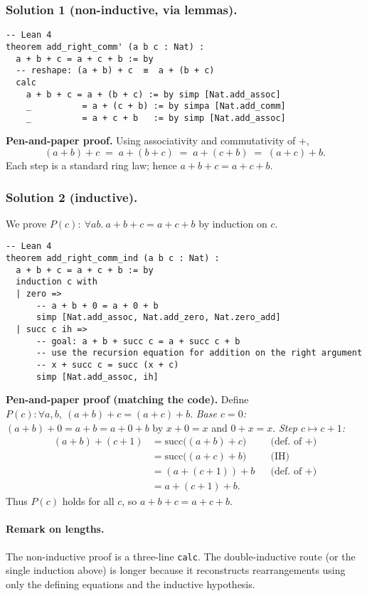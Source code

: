 \documentclass{article}
\theoremstyle{theorem}
\theoremstyle{definition}
\theoremstyle{remark}
\begin{document}
\subsubsection*{Solution 1 (non-inductive, via lemmas).}
\begin{lstlisting}
-- Lean 4
theorem add_right_comm' (a b c : Nat) :
  a + b + c = a + c + b := by
  -- reshape: (a + b) + c  ≡  a + (b + c)
  calc
    a + b + c = a + (b + c) := by simp [Nat.add_assoc]
    _          = a + (c + b) := by simpa [Nat.add_comm]
    _          = a + c + b   := by simp [Nat.add_assoc]
\end{lstlisting}

\noindent\textbf{Pen-and-paper proof.}
Using associativity and commutativity of $+$,
\[
(a+b)+c \;=\; a+(b+c) \;=\; a+(c+b) \;=\; (a+c)+b.
\]
Each step is a standard ring law; hence $a+b+c = a+c+b$.

\subsubsection*{Solution 2 (inductive).}
We prove $P(c):\ \forall a b.\ a+b+c=a+c+b$ by induction on $c$.

\begin{lstlisting}
-- Lean 4
theorem add_right_comm_ind (a b c : Nat) :
  a + b + c = a + c + b := by
  induction c with
  | zero =>
      -- a + b + 0 = a + 0 + b
      simp [Nat.add_assoc, Nat.add_zero, Nat.zero_add]
  | succ c ih =>
      -- goal: a + b + succ c = a + succ c + b
      -- use the recursion equation for addition on the right argument
      -- x + succ c = succ (x + c)
      simp [Nat.add_assoc, ih]
\end{lstlisting}

\noindent\textbf{Pen-and-paper proof (matching the code).}
Define $P(c)\!:\!\forall a,b,\ (a+b)+c=(a+c)+b$.  
\emph{Base $c=0$:} $(a+b)+0=a+b=a+0+b$ by $x+0=x$ and $0+x=x$.  
\emph{Step $c\mapsto c+1$:}
\[
\begin{aligned}
(a+b)+(c+1) &= \mathrm{succ}\big((a+b)+c\big) &&\text{(def.\ of $+$)}\\
            &= \mathrm{succ}\big((a+c)+b\big) &&\text{(IH)}\\
            &= (a+(c+1))+b                      &&\text{(def.\ of $+$)}\\
            &= a+(c+1)+b.
\end{aligned}
\]
Thus $P(c)$ holds for all $c$, so $a+b+c=a+c+b$.

\paragraph{Remark on lengths.}
The non-inductive proof is a three-line \texttt{calc}. The double-inductive route (or the single induction above) is longer because it reconstructs rearrangements using only the defining equations and the inductive hypothesis.
\end{document}
